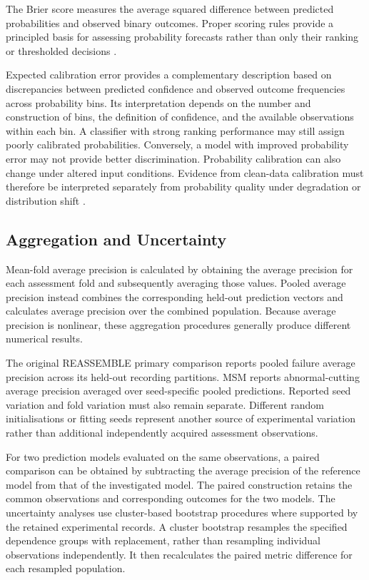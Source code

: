 The Brier score measures the average squared difference between predicted probabilities and observed binary outcomes. Proper scoring rules provide a principled basis for assessing probability forecasts rather than only their ranking or thresholded decisions \parencite{P055}.

Expected calibration error provides a complementary description based on discrepancies between predicted confidence and observed outcome frequencies across probability bins. Its interpretation depends on the number and construction of bins, the definition of confidence, and the available observations within each bin. A classifier with strong ranking performance may still assign poorly calibrated probabilities. Conversely, a model with improved probability error may not provide better discrimination. Probability calibration can also change under altered input conditions. Evidence from clean-data calibration must therefore be interpreted separately from probability quality under degradation or distribution shift \parencite{P008}.

\subsection{Aggregation and Uncertainty}

Mean-fold average precision is calculated by obtaining the average precision for each assessment fold and subsequently averaging those values. Pooled average precision instead combines the corresponding held-out prediction vectors and calculates average precision over the combined population. Because average precision is nonlinear, these aggregation procedures generally produce different numerical results.

The original REASSEMBLE primary comparison reports pooled failure average precision across its held-out recording partitions. MSM reports abnormal-cutting average precision averaged over seed-specific pooled predictions. Reported seed variation and fold variation must also remain separate. Different random initialisations or fitting seeds represent another source of experimental variation rather than additional independently acquired assessment observations.

For two prediction models evaluated on the same observations, a paired comparison can be obtained by subtracting the average precision of the reference model from that of the investigated model. The paired construction retains the common observations and corresponding outcomes for the two models. The uncertainty analyses use cluster-based bootstrap procedures where supported by the retained experimental records. A cluster bootstrap resamples the specified dependence groups with replacement, rather than resampling individual observations independently. It then recalculates the paired metric difference for each resampled population.

